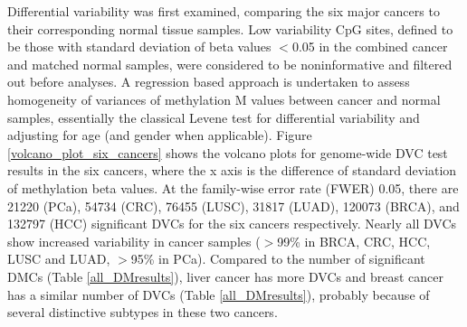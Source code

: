 \documentclass{statsoc}
\begin{document}
Differential variability was first examined, comparing the six major cancers to their corresponding normal tissue samples. Low variability CpG sites, defined to be those with standard deviation of beta values $<$0.05 in the combined cancer and matched normal samples, were considered to be noninformative and filtered out before analyses. A regression based approach is undertaken to assess homogeneity of variances of methylation M values between cancer and normal samples, essentially the classical Levene test for differential variability \citep{Brown1974,Phipson2014} and adjusting for age (and gender when applicable). Figure \ref{volcano_plot_six_cancers} shows the volcano plots for genome-wide DVC test results in the six cancers, where the x axis is the difference of standard deviation of methylation beta values. At the family-wise error rate (FWER) 0.05, there are 21220 (PCa), 54734 (CRC), 76455 (LUSC), 31817 (LUAD), 120073 (BRCA), and 132797 (HCC) significant DVCs for the six cancers respectively. Nearly all DVCs show increased variability in cancer samples ($>$99\% in BRCA, CRC, HCC, LUSC and LUAD, $>$95\% in PCa). Compared to the number of significant DMCs (Table \ref{all_DMresults}), liver cancer has more DVCs and breast cancer has a similar number of DVCs (Table \ref{all_DMresults}), probably because of several distinctive subtypes in these two cancers.
\end{document}
